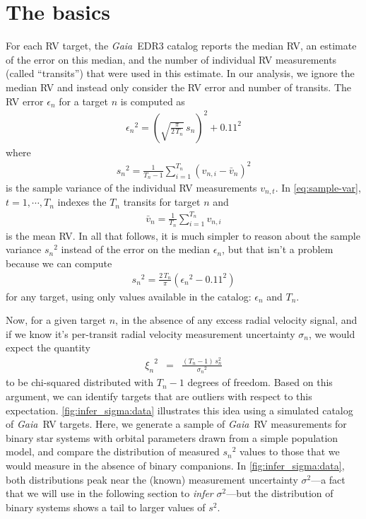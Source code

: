 \documentclass[modern, letterpaper]{aastex631}
\newcommand{\project}[1]{\textsl{#1}}
\newcommand{\Gaia}{\project{Gaia}}
\begin{document}
\section{The basics}
\label{sect:basics}

For each RV target, the \Gaia\ EDR3 catalog reports the median RV, an estimate of the error on this median, and the number of individual RV measurements (called ``transits'') that were used in this estimate.
In our analysis, we ignore the median RV and instead only consider the RV error and number of transits.
The RV error $\epsilon_n$ for a target $n$ is computed as \citep{Katz19}
\begin{eqnarray}\label{eq:rv-error-def}
	{\epsilon_n}^2 = \left(\sqrt{\frac{\pi}{2\,T_n}}\,s_n\right)^2 + 0.11^2
\end{eqnarray}
where
\begin{eqnarray}
	\label{eq:sample-var}
	{s_n}^2 = \frac{1}{T_n-1}\sum_{i=1}^{T_n} \left(v_{n,i} - \bar{v}_n\right)^2
\end{eqnarray}
is the sample variance of the individual RV measurements $v_{n,t}$.
In \autoref{eq:sample-var}, $t=1,\cdots,T_n$ indexes the $T_n$ transits for target $n$ and
\begin{eqnarray}
	\bar{v}_n = \frac{1}{T_n}\sum_{i=1}^{T_n} v_{n,i}
\end{eqnarray}
is the mean RV.
In all that follows, it is much simpler to reason about the sample variance ${s_n}^2$ instead of the error on the median ${\epsilon}_n$, but that isn't a problem because we can compute
\begin{eqnarray}
	{s_n}^2 = \frac{2\,T_n}{\pi}\left({\epsilon_n}^2 - 0.11^2\right)
\end{eqnarray}
for any target, using only values available in the catalog: $\epsilon_n$ and $T_n$.

Now, for a given target $n$, in the absence of any excess radial velocity signal, and if we know it's per-transit radial velocity measurement uncertainty $\sigma_n$, we would expect the quantity
\begin{eqnarray}
	{\xi_n}^2 &=& \frac{(T_n - 1)\,s_n^2}{{\sigma_n}^2}
	\label{eq:chi-sq-samp}
\end{eqnarray}
to be chi-squared distributed with $T_n - 1$ degrees of freedom.
Based on this argument, we can identify targets that are outliers with respect to this expectation.
\autoref{fig:infer_sigma:data} illustrates this idea using a simulated catalog of \Gaia\ RV targets.
Here, we generate a sample of \Gaia\ RV measurements for binary star systems with orbital parameters drawn from a simple population model, and compare the distribution of measured ${s_n}^2$ values to those that we would measure in the absence of binary companions.
In \autoref{fig:infer_sigma:data}, both distributions peak near the (known) measurement uncertainty $\sigma^2$---a fact that we will use in the following section to \emph{infer} $\sigma^2$---but the distribution of binary systems shows a tail to larger values of $s^2$.
\end{document}
